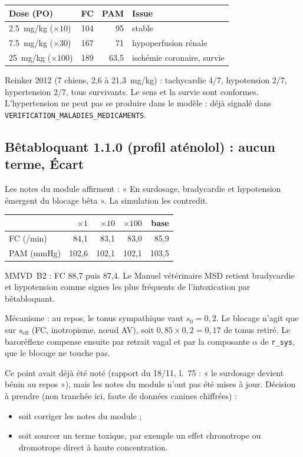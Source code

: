 \documentclass[10pt,a4paper]{article}
\newcommand{\cmd}[1]{\texttt{#1}}
\newcommand{\ecart}{\textcolor{red!70!black}{\textbf{Écart}}}
\begin{document}
\begin{center}
\begin{tabular}{lrrl}
\toprule
Dose (PO) & FC & PAM & Issue\\
\midrule
\SI{2,5}{mg/kg} ($\times 10$) & 104 & 95 & stable\\
\SI{7,5}{mg/kg} ($\times 30$) & 167 & 71 & hypoperfusion rénale\\
\SI{25}{mg/kg} ($\times 100$) & 189 & 63,5 & ischémie coronaire, survie\\
\bottomrule
\end{tabular}
\end{center}

Reinker 2012 (7 chiens, 2,6 à 21,3~mg/kg) : tachycardie 4/7, hypotension 2/7, hypertension 2/7, tous survivants. Le sens et la survie sont conformes. L'hypertension ne peut pas se produire dans le modèle : déjà signalé dans \cmd{VERIFICATION\_MALADIES\_MEDICAMENTS}.

\subsection*{Bêtabloquant 1.1.0 (profil aténolol) : aucun terme, \ecart}

Les notes du module affirment : « En surdosage, bradycardie et hypotension émergent du blocage bêta ». La simulation les contredit.

\begin{center}
\begin{tabular}{lrrrr}
\toprule
& $\times 1$ & $\times 10$ & $\times 100$ & base\\
\midrule
FC (/min) & 84,1 & 83,1 & 83,0 & 85,9\\
PAM (mmHg) & 102,6 & 102,1 & 102,1 & 103,5\\
\bottomrule
\end{tabular}
\end{center}

MMVD~B2 : FC 88,7 puis 87,4. Le Manuel vétérinaire MSD retient bradycardie et hypotension comme signes les plus fréquents de l'intoxication par bêtabloquant.

Mécanisme : au repos, le tonus sympathique vaut $s_0 = 0{,}2$. Le blocage n'agit que sur $s_\text{eff}$ (FC, inotropisme, nœud AV), soit $0{,}85 \times 0{,}2 = 0{,}17$ de tonus retiré. Le baroréflexe compense ensuite par retrait vagal et par la composante $\alpha$ de \cmd{r\_sys}, que le blocage ne touche pas.

Ce point avait déjà été noté (rapport du 18/11, l.~75 : « le surdosage devient bénin au repos »), mais les notes du module n'ont pas été mises à jour. Décision à prendre (non tranchée ici, faute de données canines chiffrées) :
\begin{itemize}
\item soit corriger les notes du module ;
\item soit sourcer un terme toxique, par exemple un effet chronotrope ou dromotrope direct à haute concentration.
\end{itemize}
\end{document}
